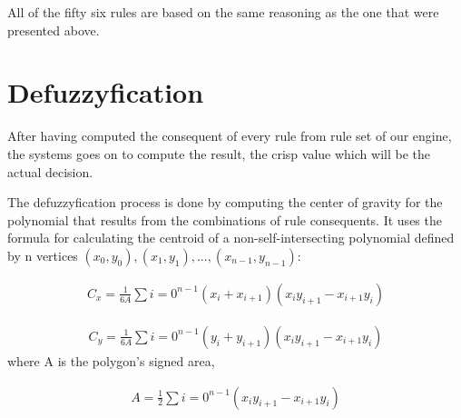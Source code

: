 \qquad All of the fifty six rules are based on the same reasoning as the one that were presented above.

\section{Defuzzyfication}

\qquad After having computed the consequent of every rule from rule set of our engine, the systems goes on
to compute the result, the crisp value which will be the actual decision.

\qquad The defuzzyfication process is done by computing the center of gravity for the polynomial that results
from the combinations of rule consequents. It uses the formula for calculating the centroid of a
non-self-intersecting polynomial defined by n vertices $(x_{0}, y_{0}), (x_{1}, y_{1}), ...,
(x_{n -1}, y_{n-1})$:

\begin{align}
    C_{x} = \frac{1}{6A} \sum{i=0}^{n - 1}(x_{i} + x_{i + 1})(x_{i}y_{i + 1} - x_{i + 1}y_{i})
\end{align}

\begin{align}
    C_{y} = \frac{1}{6A} \sum{i=0}^{n - 1}(y_{i} + y_{i + 1})(x_{i}y_{i + 1} - x_{i + 1}y_{i})
\end{align}
where A is the polygon's signed area,

\begin{align}
    A = \frac{1}{2} \sum{i=0}^{n-1}(x_{i}y_{i + 1} - x_{i + 1}y_{i})
\end{align}


